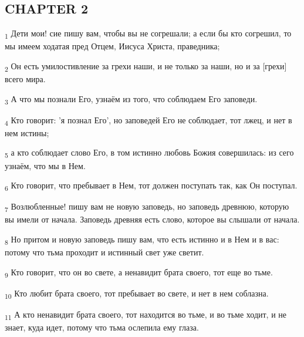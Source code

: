 \subsection{CHAPTER 2}
\begin{tcolorbox}
\textsubscript{1} Дети мои! сие пишу вам, чтобы вы не согрешали; а если бы кто согрешил, то мы имеем ходатая пред Отцем, Иисуса Христа, праведника;
\end{tcolorbox}
\begin{tcolorbox}
\textsubscript{2} Он есть умилостивление за грехи наши, и не только за наши, но и за [грехи] всего мира.
\end{tcolorbox}
\begin{tcolorbox}
\textsubscript{3} А что мы познали Его, узнаём из того, что соблюдаем Его заповеди.
\end{tcolorbox}
\begin{tcolorbox}
\textsubscript{4} Кто говорит: 'я познал Его', но заповедей Его не соблюдает, тот лжец, и нет в нем истины;
\end{tcolorbox}
\begin{tcolorbox}
\textsubscript{5} а кто соблюдает слово Его, в том истинно любовь Божия совершилась: из сего узнаём, что мы в Нем.
\end{tcolorbox}
\begin{tcolorbox}
\textsubscript{6} Кто говорит, что пребывает в Нем, тот должен поступать так, как Он поступал.
\end{tcolorbox}
\begin{tcolorbox}
\textsubscript{7} Возлюбленные! пишу вам не новую заповедь, но заповедь древнюю, которую вы имели от начала. Заповедь древняя есть слово, которое вы слышали от начала.
\end{tcolorbox}
\begin{tcolorbox}
\textsubscript{8} Но притом и новую заповедь пишу вам, что есть истинно и в Нем и в вас: потому что тьма проходит и истинный свет уже светит.
\end{tcolorbox}
\begin{tcolorbox}
\textsubscript{9} Кто говорит, что он во свете, а ненавидит брата своего, тот еще во тьме.
\end{tcolorbox}
\begin{tcolorbox}
\textsubscript{10} Кто любит брата своего, тот пребывает во свете, и нет в нем соблазна.
\end{tcolorbox}
\begin{tcolorbox}
\textsubscript{11} А кто ненавидит брата своего, тот находится во тьме, и во тьме ходит, и не знает, куда идет, потому что тьма ослепила ему глаза.
\end{tcolorbox}
